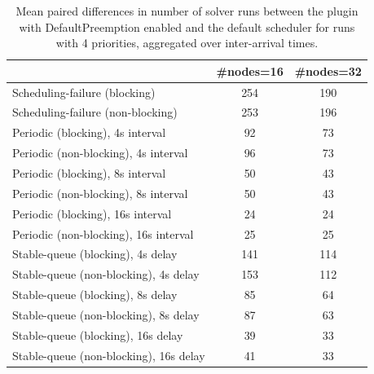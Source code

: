 \begin{table}[t]
\tiny
\setlength{\tabcolsep}{1.2pt}
\renewcommand{\arraystretch}{1.12}
\centering
\caption{Mean paired differences in number of solver runs between the plugin with DefaultPreemption enabled and the default scheduler for runs with 4 priorities, aggregated over inter-arrival times.}
\label{tab:solver_runs-defpreempt1-prio4-std0-agg-arrival}
\begin{tabular}{l c c}
\toprule
 & \#nodes=16 & \#nodes=32 \\
\midrule
Scheduling-failure (blocking) & 254 & 190 \\
Scheduling-failure (non-blocking) & 253 & 196 \\
Periodic (blocking), 4s interval & 92 & 73 \\
Periodic (non-blocking), 4s interval & 96 & 73 \\
Periodic (blocking), 8s interval & 50 & 43 \\
Periodic (non-blocking), 8s interval & 50 & 43 \\
Periodic (blocking), 16s interval & 24 & 24 \\
Periodic (non-blocking), 16s interval & 25 & 25 \\
Stable-queue (blocking), 4s delay & 141 & 114 \\
Stable-queue (non-blocking), 4s delay & 153 & 112 \\
Stable-queue (blocking), 8s delay & 85 & 64 \\
Stable-queue (non-blocking), 8s delay & 87 & 63 \\
Stable-queue (blocking), 16s delay & 39 & 33 \\
Stable-queue (non-blocking), 16s delay & 41 & 33 \\
\bottomrule
\end{tabular}
\end{table}
